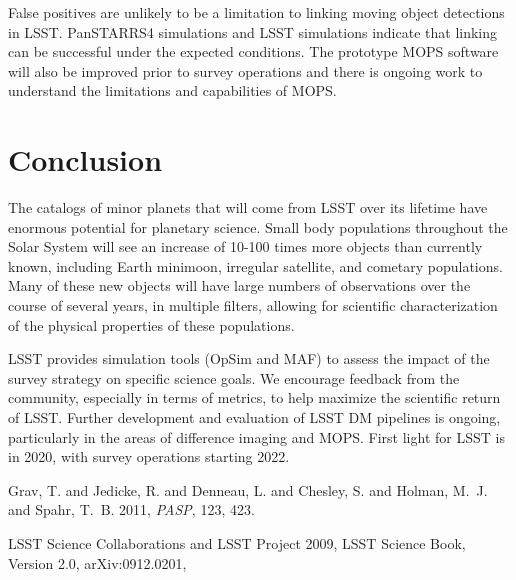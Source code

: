 \documentclass{iau}
\begin{document}
False positives are unlikely to be a limitation to linking moving
object detections in LSST. PanSTARRS4 simulations \cite{dunneau} and
LSST simulations indicate that linking can be successful under the
expected conditions. The prototype MOPS software will also be improved
prior to survey operations and there is ongoing work to understand the
limitations and capabilities of MOPS.

\section{Conclusion}

The catalogs of minor planets that will come from LSST over its
lifetime have enormous potential for planetary science. Small body
populations throughout the Solar System will see an increase of 10-100
times more objects than currently known, including Earth minimoon,
irregular satellite, and cometary populations. Many of these new
objects will have large numbers of observations over the course of
several years, in multiple filters, allowing for scientific
characterization of the physical properties of these populations.

LSST provides simulation tools (OpSim and MAF) to assess the impact of
the survey strategy on specific science goals. We encourage feedback
from the community, especially in terms of metrics, to help maximize
the scientific return of LSST. Further development and evaluation of
LSST DM pipelines is ongoing, particularly in the areas of difference
imaging and MOPS. First light for LSST is in 2020, with survey
operations starting 2022.



\begin{thebibliography}{}


 {{Grav}, T. and {Jedicke}, R. and {Denneau}, L. and {Chesley}, S. and 
	{Holman}, M.~J. and {Spahr}, T.~B.} 2011, \textit{PASP}, 123, 423.

{LSST Science Collaborations and LSST Project} 2009, LSST Science Book,
Version 2.0, arXiv:0912.0201,

\end{thebibliography}

\end{document}
